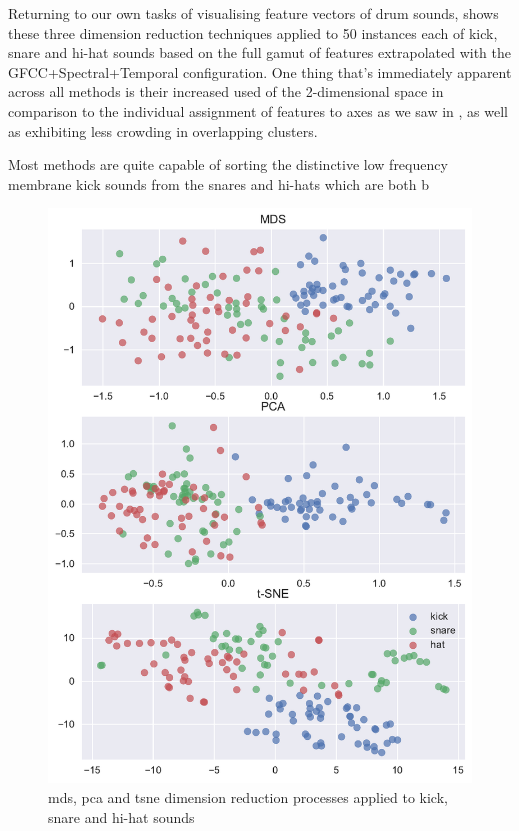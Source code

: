 Returning to our own tasks of visualising feature vectors of drum sounds,  shows these three dimension reduction techniques applied to 50 instances each of kick, snare and hi-hat sounds based on the full gamut of features extrapolated with the GFCC+Spectral+Temporal configuration. One thing that's immediately apparent across all methods is their increased used of the 2-dimensional space in comparison to the individual assignment of features to axes as we saw in , as well as exhibiting less crowding in overlapping clusters.

Most methods are quite capable of sorting the distinctive low frequency membrane kick sounds from the snares and hi-hats which are both b

\begin{figure}
	\begin{center}
		\includegraphics[width=1.0\textwidth]{ch06_rhythmcat/figures/dimension_reductions.pdf}
	\end{center}
	\caption[MDS, PCA and t-SNE Dimension Reduction on Kick,Snare and Hat Sounds]{\acrshort{mds}, \acrshort{pca} and \acrshort{tsne} dimension reduction processes applied to kick, snare and hi-hat sounds}
	\label{fig:dimension_reductions}
\end{figure}

